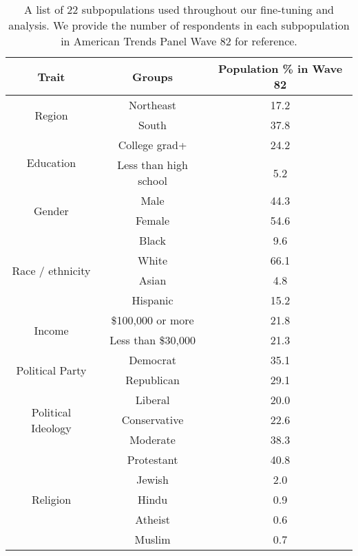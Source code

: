 \begin{table}[ht]
    \centering
    \scriptsize
    \captionsetup{font=small}
    \caption{
    A list of 22 subpopulations used throughout our fine-tuning and analysis.
    We provide the number of respondents in each subpopulation in American Trends Panel Wave 82 for reference.
    }
    \vspace{-5pt}
    \label{table:opinionqa_detail}
    \begin{tabular}{ccc}
        \toprule
        \textbf{Trait} & \textbf{Groups} & \textbf{Population \% in Wave 82} \\
        \midrule
        \multirow{2}{*}{Region} & Northeast & 17.2 \\
        & South & 37.8 \\
        \midrule
        \multirow{2}{*}{Education} & College grad+ & 24.2 \\
        & Less than high school & 5.2 \\
        \midrule
        \multirow{2}{*}{Gender} & Male & 44.3 \\
        & Female & 54.6 \\
        \midrule
        \multirow{4}{*}{Race / ethnicity} & Black & 9.6 \\
        & White & 66.1 \\
        & Asian & 4.8 \\
        & Hispanic & 15.2 \\
        \midrule
        \multirow{2}{*}{Income} & \$100,000 or more & 21.8 \\
        & Less than \$30,000 & 21.3 \\
        \midrule
        \multirow{2}{*}{Political Party} & Democrat & 35.1 \\
        & Republican & 29.1 \\
        \midrule
        \multirow{3}{*}{Political Ideology} & Liberal & 20.0 \\
        & Conservative & 22.6 \\
        & Moderate & 38.3 \\
        \midrule
        \multirow{5}{*}{Religion} & Protestant & 40.8 \\
        & Jewish & 2.0 \\
        & Hindu & 0.9 \\
        & Atheist & 0.6 \\
        & Muslim & 0.7 \\
        \bottomrule    
        \end{tabular}
\vspace{-5pt}
\end{table}